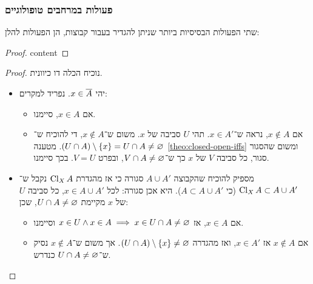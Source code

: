 \documentclass[name=רשימות טופולוגיה כללית]{../../../tex/classes/noChapterMegasumPreamble}
\begin{document}
\subsubsection{\label{ss:topoSpaceStructs}פעולות במרחבים טופולוגיים}
	שתי הפעולות הבסיסיות ביותר שניתן להגדיר בעבור קבוצות, הן הפעולות להלן: 
	\begin{proof}
		content
	\end{proof}
	\begin{proof}
		נוכיח הכלה דו כיוונית. 
		\begin{itemize}
			\item[$\subset$]יהי $x \in \overline{A}$. נפריד למקרים: 
			\begin{itemize}
				\item אם $x \in A$, סיימנו. 
				\item אם $x \notin A$, נראה ש־$x \in A'$. תהי $U$ סביבה של $x$. משום ש־$x \notin A$, די להוכיח ש־$(U \cap A) \setminus \{x\} = U \cap A \neq \varnothing$. מטענה \ref{theo:closed-open-iffs} ומשום שהסגור סגור, כל סביבה $V$ של $x$ כך ש־$V \cap A \neq \varnothing$, ובפרט $V = U$. בכך סיימנו. 
			\end{itemize}
			\item[$\supset$]מספיק להוכיח שהקבוצה $A \cup A'$ סגורה כי אז מהגדרת $\operatorname{Cl}_X A$ נקבל ש־$\operatorname{Cl}_X A \subset A \cup A'$ (כי $A \subset A \cup A'$). היא אכן סגורה: לכל $x \in A \cup A'$, כל סביבה $U$ של $x$ מקיימת $U \cap A \neq \varnothing$, שכן: 
			\begin{itemize}
				\item אם $x \in A$, אז $x \in U \land x \in A \implies x \in U \cap A \neq \varnothing$ וסיימנו. 
				\item אם $x \notin A$ אז $x \in A'$, ואז מהגדרה $(U \cap A) \setminus \{x\} \neq \varnothing$. אך משום ש־$x \notin A$ נסיק ש־$U \cap A \neq \varnothing$ כנדרש. 
			\end{itemize}
		\end{itemize}\envendproof
	\end{proof}
\end{document}
